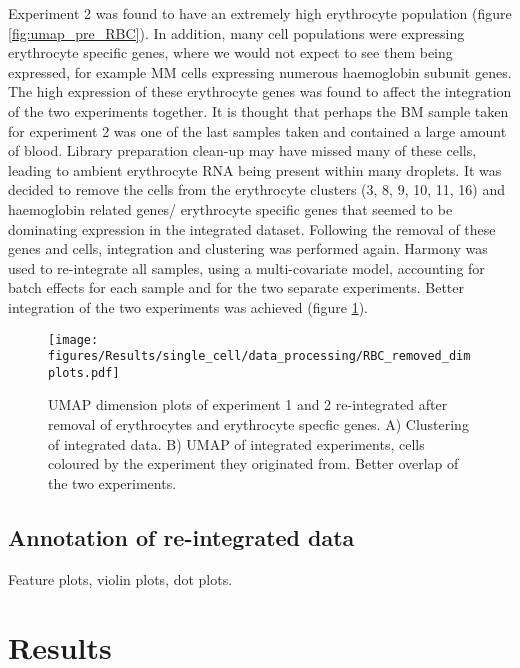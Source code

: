Experiment 2 was found to have an extremely high erythrocyte population (figure \ref{fig:umap_pre_RBC}).
In addition, many cell populations were expressing erythrocyte specific genes, where we would not expect to see them being expressed, for example MM cells expressing numerous haemoglobin subunit genes.
The high expression of these erythrocyte genes was found to affect the integration of the two experiments together.
It is thought that perhaps the BM sample taken for experiment 2 was one of the last samples taken and contained a large amount of blood.
Library preparation clean-up may have missed many of these cells, leading to ambient erythrocyte RNA being present within many droplets.
It was decided to remove the cells from the erythrocyte clusters (3, 8, 9, 10, 11, 16) and haemoglobin related genes/ erythrocyte specific genes that seemed to be dominating expression in the integrated dataset.
Following the removal of these genes and cells, integration and clustering was performed again.
Harmony was used to re-integrate all samples, using a multi-covariate model, accounting for batch effects for each sample and for the two separate experiments.
Better integration of the two experiments was achieved (figure \ref{fig:umap_post_RBC}).


\begin{figure}[htb]
    \centering
    \texttt{[image: figures/Results/single\_cell/data\_processing/RBC\_removed\_dimplots.pdf]}
    \caption[Integrated experiments post-erythrocyte removal]{UMAP dimension plots of experiment 1 and 2 re-integrated after removal of erythrocytes and erythrocyte specfic genes.
    A) Clustering of integrated data.
    B) UMAP of integrated experiments, cells coloured by the experiment they originated from.
    Better overlap of the two experiments. }
    \label{fig:umap_post_RBC}
\end{figure}

\subsection{Annotation of re-integrated data}



Feature plots, violin plots, dot plots.

\section{Results}

